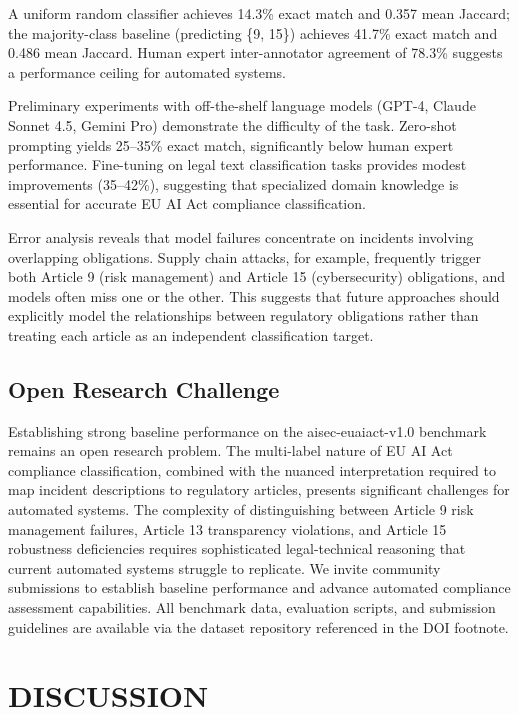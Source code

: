 \documentclass[10pt,conference]{IEEEtran}
\begin{document}
A uniform random classifier achieves 14.3\% exact match and 0.357 mean Jaccard; the majority-class baseline (predicting \{9, 15\}) achieves 41.7\% exact match and 0.486 mean Jaccard. Human expert inter-annotator agreement of 78.3\% suggests a performance ceiling for automated systems.

Preliminary experiments with off-the-shelf language models (GPT-4, Claude Sonnet 4.5, Gemini Pro) demonstrate the difficulty of the task. Zero-shot prompting yields 25--35\% exact match, significantly below human expert performance. Fine-tuning on legal text classification tasks provides modest improvements (35--42\%), suggesting that specialized domain knowledge is essential for accurate EU AI Act compliance classification.

Error analysis reveals that model failures concentrate on incidents involving overlapping obligations. Supply chain attacks, for example, frequently trigger both Article 9 (risk management) and Article 15 (cybersecurity) obligations, and models often miss one or the other. This suggests that future approaches should explicitly model the relationships between regulatory obligations rather than treating each article as an independent classification target.

\subsection{Open Research Challenge}

Establishing strong baseline performance on the aisec-euaiact-v1.0 benchmark remains an open research problem. The multi-label nature of EU AI Act compliance classification, combined with the nuanced interpretation required to map incident descriptions to regulatory articles, presents significant challenges for automated systems. The complexity of distinguishing between Article 9 risk management failures, Article 13 transparency violations, and Article 15 robustness deficiencies requires sophisticated legal-technical reasoning that current automated systems struggle to replicate. We invite community submissions to establish baseline performance and advance automated compliance assessment capabilities. All benchmark data, evaluation scripts, and submission guidelines are available via the dataset repository referenced in the DOI footnote.

\section{DISCUSSION}
\label{sec:discussion}
\end{document}
